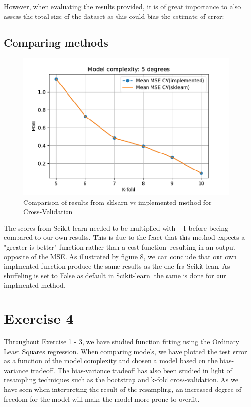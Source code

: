 \documentclass[11pt, a4paper]{article}
\begin{document}
However, when evaluating the results provided, it is of great importance to also assess the total size of the dataset as this could bias the estimate of error:

\subsection*{Comparing methods}



\begin{figure}[h]
  \centering
  \includegraphics[scale=0.75]{figures/EX3_sk_vs_implemented_CV.pdf}
  \caption{\label{fig:?}Comparison of results from sklearn vs implemented method for Cross-Validation}
\end{figure}


The scores from Scikit-learn needed to be multiplied with $-1$ before beeing compared to our own results. This is due to the feact that this method expects a "greater is better" function rather than a cost function, resulting in an output opposite of the MSE.\cite{Geron2019} As illustrated by figure 8, we can conclude that our own implmented function produce the same results as the one fra Scikit-lean. As shuffeling is set to False as default in Scikit-learn, the same is done for our implmented method.





\section*{Exercise 4}
Throughout Exercise 1 - 3, we have studied function fitting using the Ordinary Least Squares regression. When comparing models, we have plotted the test error as a function of the model complexity and chosen a model based on the bias-variance tradeoff. The bias-variance tradeoff has also been studied in light of resampling techniques such as the bootstrap and k-fold cross-validation. As we have seen when interpreting the result of the resampling, an increased degree of freedom for the model will make the model more prone to overfit.
\end{document}
